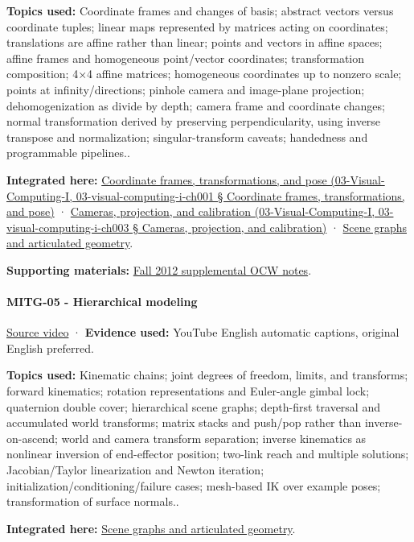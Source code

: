 \textbf{Topics used:} Coordinate frames and changes of basis; abstract vectors versus coordinate tuples; linear maps represented by matrices acting on coordinates; translations are affine rather than linear; points and vectors in affine spaces; affine frames and homogeneous point/vector coordinates; transformation composition; 4×4 affine matrices; homogeneous coordinates up to nonzero scale; points at infinity/directions; pinhole camera and image-plane projection; dehomogenization as divide by depth; camera frame and coordinate changes; normal transformation derived by preserving perpendicularity, using inverse transpose and normalization; singular-transform caveats; handedness and programmable pipelines..

\textbf{Integrated here:} \href{}{Coordinate frames, transformations, and pose (03-Visual-Computing-I, 03-visual-computing-i-ch001 § Coordinate frames, transformations, and pose)} · \href{}{Cameras, projection, and calibration (03-Visual-Computing-I, 03-visual-computing-i-ch003 § Cameras, projection, and calibration)} · \hyperref[04-visual-computing-ii-ch029]{Scene graphs and articulated geometry}.

\textbf{Supporting materials:} \href{https://ocw.mit.edu/courses/6-837-computer-graphics-fall-2012/pages/lecture-notes/}{Fall 2012 supplemental OCW notes}.

\paragraph{MITG-05 - Hierarchical modeling}\label{mitg-05---hierarchical-modeling}

\href{https://www.youtube.com/watch?v=-Dhx44D0Iok}{Source video} · \textbf{Evidence used:} YouTube English automatic captions, original English preferred.

\textbf{Topics used:} Kinematic chains; joint degrees of freedom, limits, and transforms; forward kinematics; rotation representations and Euler-angle gimbal lock; quaternion double cover; hierarchical scene graphs; depth-first traversal and accumulated world transforms; matrix stacks and push/pop rather than inverse-on-ascend; world and camera transform separation; inverse kinematics as nonlinear inversion of end-effector position; two-link reach and multiple solutions; Jacobian/Taylor linearization and Newton iteration; initialization/conditioning/failure cases; mesh-based IK over example poses; transformation of surface normals..

\textbf{Integrated here:} \hyperref[04-visual-computing-ii-ch029]{Scene graphs and articulated geometry}.

